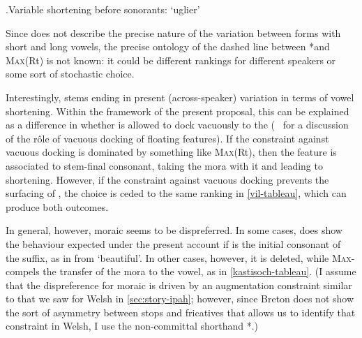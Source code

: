 \ex.\label{vil-tableau}Variable shortening before sonorants:  `uglier'\\

Since \citet{humphreys95:_phonol_bothoa_saint_nicol_pelem} does not describe the precise nature of the variation between forms with short and long vowels, the precise ontology of the dashed line between *\mo[C] and \textsc{Max}(Rt) is not known: it could be different rankings for different speakers or some sort of stochastic choice.

Interestingly, stems ending in \ipa{[h]} present (across-speaker) variation in terms of vowel shortening. Within the framework of the present proposal, this can be explained as a difference in whether  is allowed to dock vacuously to the \ipa{[h]} (\cf\ \citealt{wolf2005,wolf-forautosegs} for a discussion of the rôle of vacuous docking of floating features). If the constraint against vacuous docking is dominated by something like \textsc{Max}(Rt), then the feature is associated to stem-final consonant, taking the mora with it and leading to shortening. However, if the constraint against vacuous docking prevents the surfacing of , the choice is ceded to the same ranking in \cref{vil-tableau}, which can produce both outcomes.

In general, however, moraic \ipa{[h]} seems to be dispreferred. In some cases, \ipa{[h]} does show the behaviour expected under the present account if \ipa{[h]} is the initial consonant of the suffix, as in \alternation{[ˈbrahɒh]}{[ˈbraːɒh]} from \ipa{[ˈbraː]} `beautiful'. In other cases, however, it is deleted, while \textsc{Max}-\mo compels the transfer of the mora to the vowel, as in \ref{kastisoch-tableau}. (I assume that the dispreference for moraic \ipa{[h]} is driven by an augmentation constraint similar to that we saw for Welsh in \cref{sec:story-ipah}; however, since Breton does not show the sort of asymmetry between stops and fricatives that allows us to identify that constraint in Welsh, I use the non\hyp committal shorthand *.)

